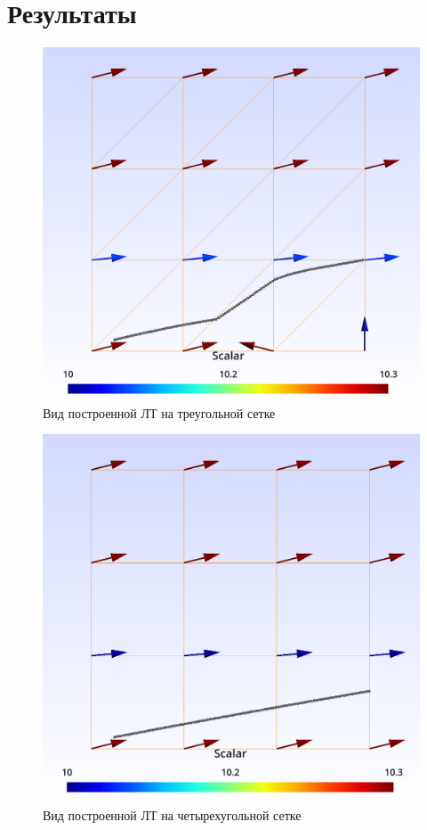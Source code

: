 \chapter{Результаты}

\begin{figure}[H]
	\centering
	\includegraphics[width=0.6\linewidth]{img/test-3}
	\caption{Вид построенной ЛТ на треугольной сетке}
	\label{fig:test-3}
\end{figure}
\begin{figure}[H]
	\centering
	\includegraphics[width=0.6\linewidth]{img/test}
	\caption{Вид построенной ЛТ на четырехугольной сетке}
	\label{fig:test}
\end{figure}

